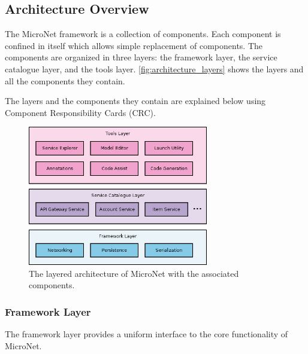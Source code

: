\subsection{Architecture Overview}

The MicroNet framework is a collection of components. Each component is
confined in itself which allows simple replacement of components. The components
are organized in three layers: the framework layer, the service catalogue layer,
and the tools layer. \autoref{fig:architecture_layers} shows the layers and all
the components they contain.

The layers and the components they contain are explained below using Component
Responsibility Cards (CRC).

\begin{figure}
  \centering
  \includegraphics[width=0.7\textwidth]{images/architecture/ArchitectureLayers}
  \caption{The layered architecture of MicroNet with the associated components.}
  \label{fig:architecture_layers}
\end{figure}

\subsubsection{Framework Layer}

The framework layer provides a uniform interface to the core functionality of
MicroNet.\\

